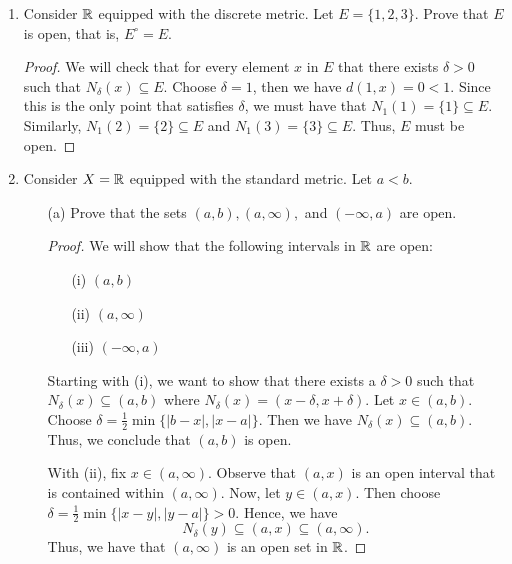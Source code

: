 \documentclass[a4paper]{article}
\begin{document}
\begin{enumerate}
\begin{proof}
        For (ii), note that the complement of \( \emptyset \) is just \( X  \) itself. Since \( X  \) is open by problem 4, we see that \( X^{c} = \emptyset \) must be closed.
        \end{proof}
    \item Consider \( \mathbb{R}  \) equipped with the discrete metric. Let \( E = \{ 1,2,3 \} \). Prove that \( E  \) is open, that is, \( E^{\circ} = E  \).
        \begin{proof}
        We will check that for every element \( x  \) in \( E  \) that there exists \( \delta > 0  \) such that \( {N}_{\delta}(x) \subseteq E  \). Choose \( \delta = 1  \), then we have \( d(1,x) = 0 < 1   \). Since this is the only point that satisfies \( \delta \), we must have that \( {N}_{1}(1) = \{ 1 \} \subseteq E   \). Similarly, \( {N}_{1}(2) = \{ 2 \}  \subseteq  E  \) and \( {N}_{1}(3) = \{ 3 \}  \subseteq E  \). Thus, \( E  \) must be open.
        \end{proof}
    \item Consider \( X = \mathbb{R}  \) equipped with the standard metric. Let \( a < b  \). 
        \begin{enumerate}
            \item[(a)] Prove that the sets \( (a,b), (a,\infty ),  \) and \( (-\infty , a) \) are open.
                \begin{proof}
                We will show that the following intervals in \( \mathbb{R}  \) are open:                
                \begin{enumerate}
                    \item[(i)] \( (a,b) \)
                    \item[(ii)] \( (a,\infty ) \)
                    \item[(iii)] \( (-\infty , a) \)
                \end{enumerate}
                Starting with (i), we want to show that there exists a \( \delta > 0  \) such that \( {N}_{\delta}(x) \subseteq (a,b) \) where \( {N}_{\delta}(x) = ( x - \delta, x + \delta) \). Let \( x \in (a,b) \). Choose \( \delta = \frac{ 1 }{ 2 } \min \{ |b - x|, |x - a|  \}  \). Then we have \( {N}_{\delta}(x) \subseteq (a,b)  \). Thus, we conclude that \( (a,b) \) is open.
                
                With (ii), fix \( x \in (a,\infty ) \). Observe that \( (a,x) \) is an open interval that is contained within \( (a,\infty ) \). Now, let \( y \in (a,x) \). Then choose \( \delta = \frac{ 1 }{ 2 }  \min \{ | x - y |, | y - a |\} > 0    \). Hence, we have        
                \[  {N}_{\delta}(y) \subseteq (a,x) \subseteq (a,\infty ). \]
                Thus, we have that \( (a,\infty ) \) is an open set in \( \mathbb{R}  \).


\end{proof}
\end{enumerate}
\end{enumerate}
\end{document}
